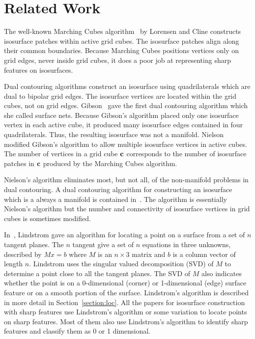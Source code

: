 

\section{Related Work}
\label{section:related}

The well-known Marching Cubes algorithm~\cite{lc-mchr3-87}
by Lorensen and Cline
constructs isosurface patches within active grid cubes.
The isosurface patches align along their common boundaries.
Because Marching Cubes positions vertices only on grid edges,
never inside grid cubes,
it does a poor job at representing sharp features on isosurfaces.

Dual contouring algorithms construct an isosurface using quadrilaterals
which are dual to bipolar grid edges.
The isosurface vertices are located within the grid cubes,
not on grid edges.
Gibson~\cite{gh-ssqem-97,g-cesng-98} gave the first dual contouring algorithm
which she called surface nets.
Because Gibson's algorithm placed only one isosurface vertex 
in each active cube,
it produced many isosurface edges contained in four quadrilaterals.
Thus, the resulting isosurface was not a manifold.
Nielson~\cite{n-dmc-04} modified Gibson's algorithm
to allow multiple isosurface vertices in active cubes.
The number of vertices in a grid cube $\mathbf{c}$
corresponds to the number of isosurface patches in $\mathbf{c}$
produced by the Marching Cubes algorithm.

Nielson's algorithm eliminates most, but not all, 
of the non-manifold problems in dual contouring.
A dual contouring algorithm
for constructing an isosurface which is a always a manifold
is contained in~\cite{Wenger:2013:Isosurfaces}.
The algorithm is essentially Nielson's algorithm
but the number and connectivity of isosurface vertices in grid cubes
is sometimes modified.

In~\cite{l-oslpm-00}, Lindstrom gave an algorithm for locating a point 
on a surface from a set of $n$ tangent planes.
The $n$ tangent give a set of $n$ equations in three unknowns,
described by $M x = b$ where $M$ is an $n \times 3$ matrix 
and $b$ is a column vector of length $n$.
Lindstrom uses the singular valued decomposition (SVD) of $M$
to determine a point close to all the tangent planes.
The SVD of $M$ also indicates whether the point is
on a 0-dimensional (corner) or 1-dimensional (edge) surface feature
or on a smooth portion of the surface.
Lindstrom's algorithm is described in more detail 
in Section~\ref{section:loc}.
All the papers for isosurface construction with sharp features
use Lindstrom's algorithm or some variation
to locate points on sharp features.
Most of them also use Lindstrom's algorithm to identify sharp features
and classify them as 0 or 1 dimensional.

